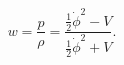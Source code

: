 \begin{equation}
w=\frac{p}{\rho }=\frac{\frac{1}{2}\dot{\phi}^{2}-V}{\frac{1}{2}\dot{\phi}%
^{2}+V}.
\end{equation}

